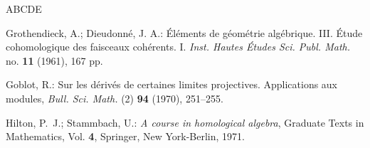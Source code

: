 \documentclass[reqno,11pt]{amsart}
\theoremstyle{plain}
\theoremstyle{remark}
\theoremstyle{definition}
\numberwithin{equation}{thm}
\begin{document}
\begin{thebibliography}{ABCDE}
		
		
		
		
 Grothendieck, A.; Dieudonné, J. A.: Éléments de géométrie algébrique. III. Étude cohomologique des faisceaux cohérents. I. \textit{Inst. Hautes Études Sci. Publ. Math.} no. \textbf{11} (1961), 167 pp.
		
 Goblot, R.: Sur les d\'eriv\'es de certaines limites projectives. Applications aux modules, \textit{Bull. Sci. Math.} (2) {\bf 94} (1970), 251--255.
		
		
		
		
		
		
 Hilton, P.~J.; Stammbach, U.: {\it A course in homological algebra}, Graduate Texts in Mathematics, Vol. \textbf{4}, Springer, New York-Berlin, 1971.
		
		
		

\end{thebibliography}
\end{document}
